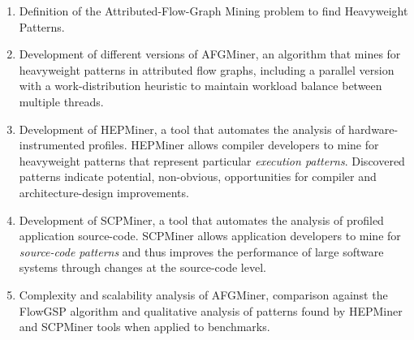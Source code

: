 \begin{enumerate}
\item Definition of the Attributed-Flow-Graph Mining problem to find Heavyweight Patterns.

\item Development of different versions of AFGMiner, an algorithm that mines for heavyweight patterns in attributed flow graphs, including a parallel version with a work-distribution heuristic to maintain workload balance between multiple threads.

\item Development of HEPMiner, a tool that automates the analysis of hardware-instrumented profiles. HEPMiner allows compiler developers to mine for heavyweight patterns that represent particular \emph{execution patterns}. Discovered patterns indicate potential, non-obvious, opportunities for compiler and architecture-design improvements.

\item Development of SCPMiner, a tool that automates the analysis of profiled application source-code. SCPMiner allows application developers to mine for \emph{source-code patterns} and thus improves the performance of large software systems through changes at the source-code level.

\item Complexity and scalability analysis of AFGMiner, comparison against the FlowGSP algorithm and qualitative analysis of patterns found by HEPMiner and SCPMiner tools when applied to benchmarks.
\end{enumerate} 




